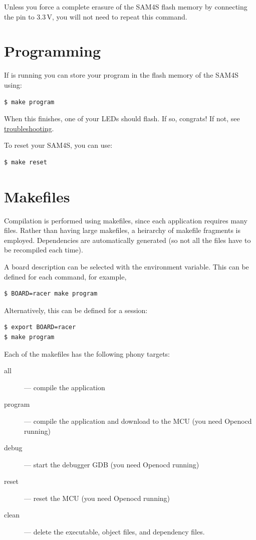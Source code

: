 Unless you force a complete erasure of the SAM4S flash memory by
connecting the  pin to 3.3\,V, you will not need to repeat
this command.

\section{Programming}
\label{programming}

If  is running you can store your program in the flash
memory of the SAM4S using:

\begin{verbatim}
$ make program
\end{verbatim}

When this finishes, one of your LEDs should flash. If so, congrats! If
not, see \protect\hyperref[troubleshooting]{troubleshooting}.

To reset your SAM4S, you can use:
%
\begin{verbatim}
$ make reset
\end{verbatim}


\section{Makefiles}

Compilation is performed using makefiles, since each application
requires many files.  Rather than having large makefiles, a heirarchy
of makefile fragments is employed.  Dependencies are automatically
generated (so not all the files have to be recompiled each time).

A board description can be selected with the  environment
variable.  This can be defined for each command, for example,
%
\begin{verbatim}
$ BOARD=racer make program
\end{verbatim}


Alternatively, this can be defined for a session:
%
\begin{verbatim}
$ export BOARD=racer
$ make program
\end{verbatim}


Each of the makefiles has the following phony targets:
%
\begin{description}
\item[all]  --- compile the application
\item[program] --- compile the application and download to the MCU (you need Openocd running)
\item[debug] --- start the debugger GDB (you need Openocd running)
\item[reset] --- reset the MCU (you need Openocd running)
\item[clean] --- delete the executable, object files, and dependency files.
\end{description}
